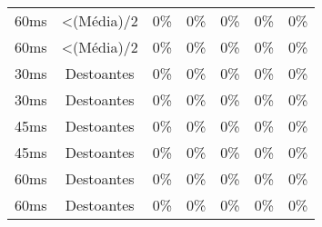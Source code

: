 \begin{table}[]
\begin{tabular}{|c|c|ccccc|}
60ms              & \textless (Média)/2 & 0\%            & 0\%            & 0\%            & 0\%            & 0\%            \\
60ms              & \textless (Média)/2 & 0\%            & 0\%            & 0\%            & 0\%            & 0\%            \\ \hline
30ms              & Destoantes          & 0\%            & 0\%            & 0\%            & 0\%            & 0\%            \\
30ms              & Destoantes          & 0\%            & 0\%            & 0\%            & 0\%            & 0\%            \\
45ms              & Destoantes          & 0\%            & 0\%            & 0\%            & 0\%            & 0\%            \\
45ms              & Destoantes          & 0\%            & 0\%            & 0\%            & 0\%            & 0\%            \\
60ms              & Destoantes          & 0\%            & 0\%            & 0\%            & 0\%            & 0\%            \\
60ms              & Destoantes          & 0\%            & 0\%            & 0\%            & 0\%            & 0\%            \\ \hline
\end{tabular}
\end{table}
